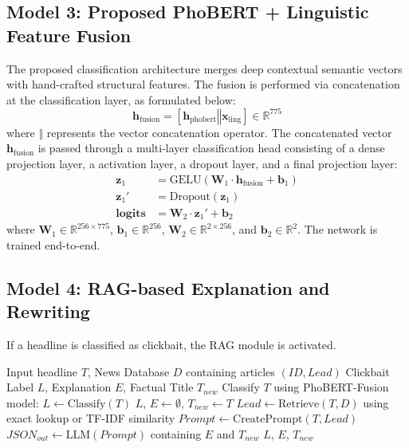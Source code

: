 \documentclass[conference]{IEEEtran}
\begin{document}
\subsection{Model 3: Proposed PhoBERT + Linguistic Feature Fusion}
The proposed classification architecture merges deep contextual semantic vectors with hand-crafted structural features. The fusion is performed via concatenation at the classification layer, as formulated below:
\begin{equation}
\mathbf{h}_{\text{fusion}} = [\mathbf{h}_{\text{phobert}} \mathbin{\Vert} \mathbf{x}_{\text{ling}}] \in \mathbb{R}^{775}
\end{equation}
where $\mathbin{\Vert}$ represents the vector concatenation operator. The concatenated vector $\mathbf{h}_{\text{fusion}}$ is passed through a multi-layer classification head consisting of a dense projection layer, a activation layer, a dropout layer, and a final projection layer:
\begin{align}
\mathbf{z}_1 &= \text{GELU}(\mathbf{W}_1 \cdot \mathbf{h}_{\text{fusion}} + \mathbf{b}_1) \\
\mathbf{z}_1' &= \text{Dropout}(\mathbf{z}_1) \\
\mathbf{logits} &= \mathbf{W}_2 \cdot \mathbf{z}_1' + \mathbf{b}_2
\end{align}
where $\mathbf{W}_1 \in \mathbb{R}^{256 \times 775}$, $\mathbf{b}_1 \in \mathbb{R}^{256}$, $\mathbf{W}_2 \in \mathbb{R}^{2 \times 256}$, and $\mathbf{b}_2 \in \mathbb{R}^2$. The network is trained end-to-end.

\subsection{Model 4: RAG-based Explanation and Rewriting}
If a headline is classified as clickbait, the RAG module is activated.
\begin{algorithm}[H]
\caption{Retrieval-Augmented Clickbait Explanation and Rewriting}
\begin{algorithmic}[1]
\REQUIRE Input headline $T$, News Database $D$ containing articles $(ID, Lead)$
\ENSURE Clickbait Label $L$, Explanation $E$, Factual Title $T_{new}$
\STATE Classify $T$ using PhoBERT-Fusion model: $L \leftarrow \text{Classify}(T)$
    \RETURN $L$, $E \leftarrow \emptyset$, $T_{new} \leftarrow T$
\ELSE
    \STATE {}
    \STATE $Lead \leftarrow \text{Retrieve}(T, D)$ using exact lookup or TF-IDF similarity
    \STATE {}
    \STATE $Prompt \leftarrow \text{CreatePrompt}(T, Lead)$
    \STATE {}
    \STATE $JSON_{out} \leftarrow \text{LLM}(Prompt)$ containing $E$ and $T_{new}$
    \RETURN $L$, $E$, $T_{new}$
\ENDIF
\end{algorithmic}
\label{alg:rag}
\end{algorithm}
\end{document}

